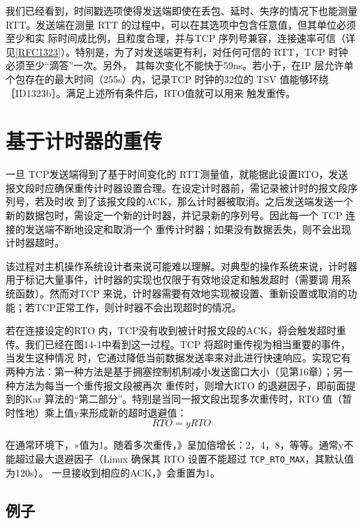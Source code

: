 我们已经看到，时间戳选项使得发送端即使在丢包、延时、失序的情况下也能测量RTT。发送端在测量 RTT 的过程中，可以在其选项中包含任意值，但其单位必须至少和实
际时间成比例，且粒度合理，并与TCP 序列号兼容，连接速率可信（详见\href{https://www.rfc-editor.org/rfc/rfc1323}{[RFC1323]}）。特别是，为了对发送端更有利，对任何可信的 RTT，TCP 时钟必须至少“滴答”一次。另外，
其每次变化不能快于59ns。若小于，在IP 层允许单个包存在的最大时间（255s）内，记录TCP 时钟的32位的 TSV 值能够环绕［ID1323b］。满足上述所有条件后，RTO值就可以用来
触发重传。

\section{基于计时器的重传}
一旦 TCP发送端得到了基于时间变化的 RTT测量值，就能据此设置RTO，发送报文段时应确保重传计时器设置合理。在设定计时器前，需记录被计时的报文段序列号，若及时收
到了该报文段的ACK，那么计时器被取消。之后发送端发送一个新的数据包时，需设定一个新的计时器，并记录新的序列号。因此每一个 TCP 连接的发送端不断地设定和取消一个
重传计时器；如果没有数据丢失，则不会出现计时器超时。

\begin{tcolorbox}
    该过程对主机操作系统设计者来说可能难以理解。对典型的操作系统来说，计时器用于标记大量事件，计时器的实现也仅限于有效地设定和触发超时（需要调
    用系统函数）。然而对TCP 来说，计时器需要有效地实现被设置、重新设置或取消的功能；若TCP正常工作，则计时器不会出现超时的情况。
\end{tcolorbox}

若在连接设定的RTO 内，TCP没有收到被计时报文段的ACK，将会触发超时重传。我们已经在图14-1中看到这一过程。TCP 将超时重传视为相当重要的事件，当发生这种情况
时，它通过降低当前数据发送率来对此进行快速响应。实现它有两种方法：第一种方法是基于拥塞控制机制减小发送窗口大小（见第16章）；另一种方法为每当一个重传报文段被再次
重传时，则增大RTO 的退避因子，即前面提到的Kar 算法的“第二部分”。特别是当同一报文段出现多次重传时，RTO 值（暂时性地）乘上值y来形成新的超时退避值：
\begin{equation}
RTO = yRTO
\end{equation}

在通常环境下，»值为1。随着多次重传，》呈加倍增长：2，4，8，等等。通常y不能超过最大退避因子（Linux 确保其 RTO 设置不能超过 \verb|TCP_RTO_MAX|，其默认值为120s）。
一旦接收到相应的ACK，》会重置为1。

\subsection{例子}

